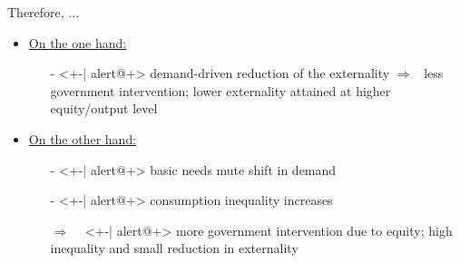 \documentclass[11pt,aspectratio=169]{beamer}
\newcommand{\ar}{$\Rightarrow$ \ }
\begin{document}
\begin{frame}{Therefore, ...}
\begin{itemize}
			\item<+-> \underline{On the one hand:}
			\begin{itemize}	 %
				\vspace{2mm}
				\item[-]<+-| alert@+> demand-driven reduction of the externality
				\ar less government intervention; lower externality attained at higher equity/output level
			\end{itemize}
			\vspace{2mm}
			\item<+-> \underline{On the other hand:}
			\begin{itemize}	
				\vspace{2mm}
				\item[-]<+-| alert@+> basic needs mute shift in demand
				\vspace{1mm}
				\item[-]<+-| alert@+> consumption inequality increases
				\vspace{2mm}
				\item[\ar]<+-| alert@+> more government intervention due to equity; high inequality and small reduction in externality %
				

\end{itemize}
\end{itemize}
\end{frame}
\end{document}
